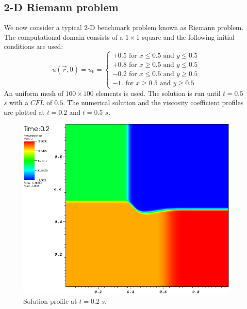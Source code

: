 \subsection{2-D Riemann problem}\label{sec:2dnum_sct2b}
We now consider a typical 2-D benchmark problem known as Riemann problem. The computational domain consists of a $1 \times 1$ square and the following initial conditions are used:
%
\begin{equation}\label{eq:bg_2d_ic_sct2b}
u(\vec{r},0) = u_0 = \left\{
\begin{array}{l}
+0.5 \text{ for } x \leq 0.5 \text{ and } y \leq 0.5 \\
+0.8 \text{ for } x \geq 0.5 \text{ and } y \leq 0.5 \\
-0.2 \text{ for } x \leq 0.5 \text{ and } y \geq 0.5 \\
-1. \text{ for } x \geq 0.5 \text{ and } y \geq 0.5
\end{array}
\nonumber
\right.
\end{equation}
%
An uniform mesh of $100 \times 100$ elements is used. The solution is run until $t=0.5$ $s$ with a $CFL$ of $0.5$. The numerical solution and the viscosity coefficient profiles are plotted at $t=0.2$ and $t=0.5$ $s$. 
%
\begin{figure}[H]
	\centering
	\includegraphics[width=\textwidth]{figures/Burger2D_sol_t0p2.png}
	\caption{Solution profile at $t=0.2$ $s$.}
	\label{fig:2d_burger_sol_t0p2}
\end{figure}
